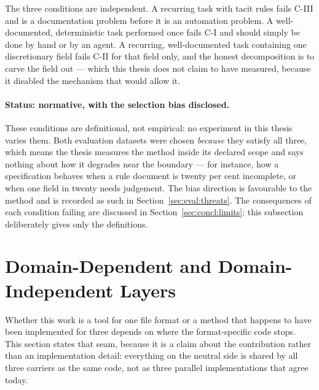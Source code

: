 The three conditions are independent. A recurring task with tacit rules fails C-III and is
a documentation problem before it is an automation problem. A well-documented,
deterministic task performed once fails C-I and should simply be done by hand or by an
agent. A recurring, well-documented task containing one discretionary field fails C-II for
that field only, and the honest decomposition is to carve the field out --- which this
thesis does not claim to have measured, because it disabled the mechanism that would allow
it.

\paragraph{Status: normative, with the selection bias disclosed.}
These conditions are definitional, not empirical: no experiment in this thesis varies them.
Both evaluation datasets were chosen \emph{because} they satisfy all three, which means the
thesis measures the method inside its declared scope and says nothing about how it degrades
near the boundary --- for instance, how a specification behaves when a rule document is
twenty per cent incomplete, or when one field in twenty needs judgement. The bias direction
is favourable to the method and is recorded as such in Section~\ref{sec:eval:threats}. The
consequences of each condition failing are discussed in Section~\ref{sec:concl:limits};
this subsection deliberately gives only the definitions.


\section{Domain-Dependent and Domain-Independent Layers}
\label{sec:design:layers}

Whether this work is a tool for one file format or a method that happens to have been
implemented for three depends on where the format-specific code stops. This section states
that seam, because it is a claim about the contribution rather than an implementation
detail: everything on the neutral side is shared by all three carriers as the same code,
not as three parallel implementations that agree today.

